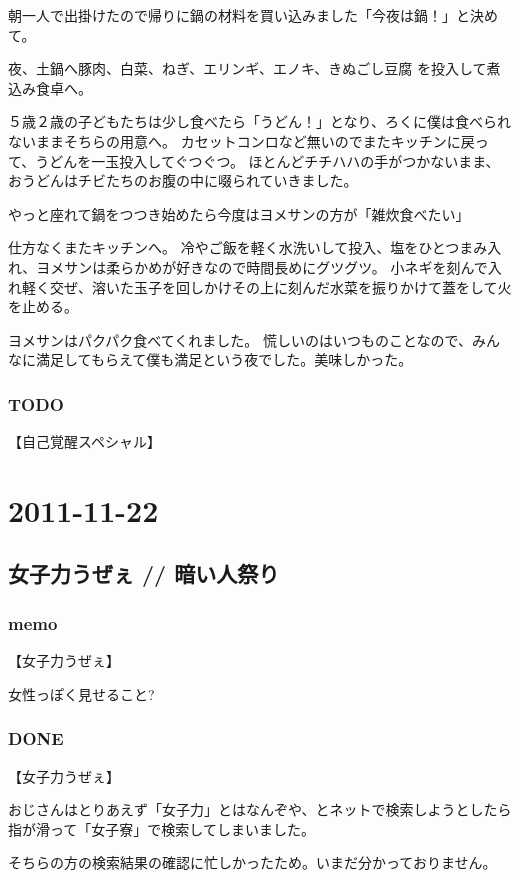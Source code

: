 \documentclass[11pt]{article}
\begin{document}
朝一人で出掛けたので帰りに鍋の材料を買い込みました「今夜は鍋！」と決めて。

夜、土鍋へ豚肉、白菜、ねぎ、エリンギ、エノキ、きぬごし豆腐 を投入して煮込み食卓へ。

５歳２歳の子どもたちは少し食べたら「うどん！」となり、ろくに僕は食べられないままそちらの用意へ。
カセットコンロなど無いのでまたキッチンに戻って、うどんを一玉投入してぐつぐつ。
ほとんどチチハハの手がつかないまま、おうどんはチビたちのお腹の中に啜られていきました。

やっと座れて鍋をつつき始めたら今度はヨメサンの方が「雑炊食べたい」

仕方なくまたキッチンへ。
冷やご飯を軽く水洗いして投入、塩をひとつまみ入れ、ヨメサンは柔らかめが好きなので時間長めにグツグツ。
小ネギを刻んで入れ軽く交ぜ、溶いた玉子を回しかけその上に刻んだ水菜を振りかけて蓋をして火を止める。

ヨメサンはパクパク食べてくれました。
慌しいのはいつものことなので、みんなに満足してもらえて僕も満足という夜でした。美味しかった。
\subsubsection{\textbf{TODO}}
\label{sec-32_2_1}

【自己覚醒スペシャル】
\section{2011-11-22}
\label{sec-33}
\subsection{女子力うぜぇ // 暗い人祭り}
\label{sec-33_1}
\subsubsection{memo}
\label{sec-33_1_1}

【女子力うぜぇ】

女性っぽく見せること?
\subsubsection{\textbf{DONE}}
\label{sec-33_1_2}

【女子力うぜぇ】

おじさんはとりあえず「女子力」とはなんぞや、とネットで検索しようとしたら
指が滑って「女子寮」で検索してしまいました。

そちらの方の検索結果の確認に忙しかったため。いまだ分かっておりません。
\end{document}
